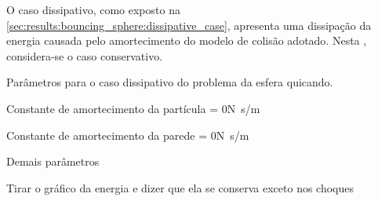 O caso dissipativo, como exposto na \cref{sec:results:bouncing_sphere:dissipative_case}, apresenta uma dissipação da energia causada pelo amortecimento do modelo de colisão adotado. Nesta , considera-se o caso conservativo.

\begin{table}[h]
\centering
\caption{Parâmetros para o caso dissipativo do problema da esfera quicando.}
\label{tab:bouncing_sphere:conservative:parameters}
\begin{parametersdesc}{0.8\textwidth}
	\item{Constante de amortecimento da partícula}{\ind{\normalDampingConstant}{\particle} = 0}{\si[per-mode=symbol]{\newton\second\per\meter}}
	\item{Constante de amortecimento da parede}{\ind{\normalDampingConstant}{\element} = 0}{\si[per-mode=symbol]{\newton\second\per\meter}}
	\item{Demais parâmetros}{}{}
\end{parametersdesc}
\sourceMe 
\end{table}

\alert{Tirar o gráfico da energia e dizer que ela se conserva exceto nos choques}

